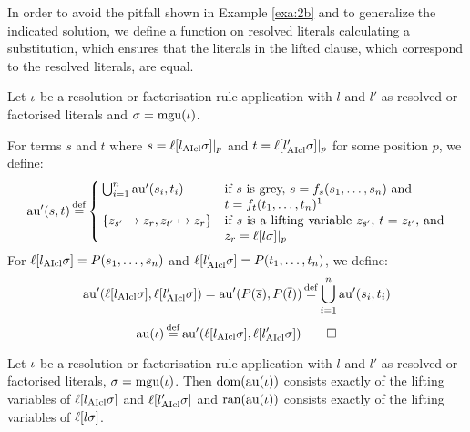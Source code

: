 \documentclass[,%
	draft=false,%
	numbers=noendperiod
	11pt,
	a4paper,
	oneside,%
	openany,
]{memoir}
\begin{document}
In order to avoid the pitfall shown in Example \ref{exa:2b} and to generalize the indicated solution,
we define a function on resolved literals calculating a substitution, which ensures that the literals in the lifted clause, which correspond to the resolved literals, are equal.

\begin{defi}[$\aiu$]
	Let $\iota$ be a resolution or factorisation rule application with $l$ and $l'$ as resolved or factorised literals and $\sigma = \operatorname{mgu}(\iota)$.

	\newcommand{\aiuP}{\aiu'}

	For terms $s$ and $t$ where
	$s = \ell[l_{\operatorname{AIcl}}\sigma]|_{p}$
	and
	$t = \ell[l'_{\operatorname{AIcl}}\sigma]|_{p}$
	for some position $p$, we define:
	\[
		\aiuP (s, t) \defeq
		\begin{cases}
			\bigcup_{i=1}^n \aiuP(s_i, t_i) &
			\parbox[t]{.50\textwidth}{
			if $s$ is grey, $s=f_s(s_1, \dots, s_n)$ and\newline$t = f_{t}(t_1,\dots, t_n)$\footnotemark} \\
			\{z_{s'} \mapsto z_r, z_{t'} \mapsto z_r\} &
			\parbox[t]{.50\textwidth}{
				if $s$ is a lifting variable $z_{s'}$, $t = z_{t'}$,
				and $z_r = \lifboth{l\sigma}\at{p}$
			}
		\end{cases}
	\]
	For $\ell[l_{\operatorname{AIcl}}\sigma] = P(s_1, \dots, s_n)$ and $\ell[l'_{\operatorname{AIcl}}\sigma] = P(t_1, \dots, t_n)$, we define:
	\[
		\aiuP(\lifboth{l\cl\sigma}, \lifboth{l'\cl\sigma}) =
		\aiuP(P(\overline s), P(\overline t)) \defeq \bigcup_{i=1}^n \aiuP(s_i, t_i)
	\]
	\[
		\aiu(\inference) \defeq \aiuP(\lifboth{l\cl\sigma}, \lifboth{l'\cl\sigma}) \qedhere
	\]
\end{defi}

\begin{prop}
	\label{prop:tau_dom_ran}
	Let $\iota$ be a resolution or factorisation rule application with $l$ and $l'$ as resolved or factorised literals, $\sigma = \operatorname{mgu}(\iota)$.
	Then $\operatorname{dom}(\operatorname{au}(\iota))$ consists exactly of the lifting variables of $\ell[l_{\operatorname{AIcl}}\sigma]$ and $\ell[l'_{\operatorname{AIcl}}\sigma]$ and $\operatorname{ran}(\operatorname{au}(\iota))$ consists exactly of the lifting variables of $\ell[l\sigma]$.
\end{prop}
\end{document}
